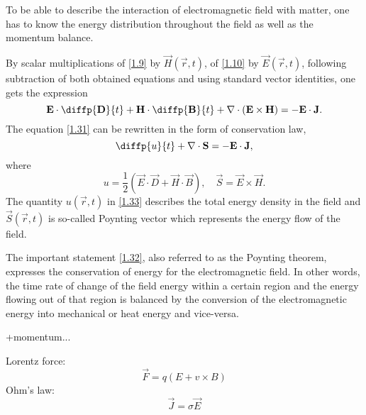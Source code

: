 To be able to describe the interaction of electromagnetic field with matter, one has to know the energy distribution throughout the field as well as the momentum balance.

By scalar multiplications of \ref{1.9} by $ \vec{H}\left( \vec{r}, t \right) $, of \ref{1.10} by $ \vec{E}\left( \vec{r}, t \right) $, following subtraction of both obtained equations and using standard vector identities, one gets the expression 
\begin{equation}
\label{1.31}
\vec{E} \cdot \diffp{\vec{D}}{t} + \vec{H} \cdot \diffp{\vec{B}}{t} + \div{\left(\vec{E} \times \vec{H} \right)} = -\vec{E} \cdot \vec{J}.
\end{equation}
The equation \ref{1.31} can be rewritten in the form of conservation law,
\begin{equation}
\label{1.32}
\diffp{u}{t} + \div{\vec{S}} = - \vec{E} \cdot \vec{J},
\end{equation}
where
\begin{equation}
\label{1.33}
u = \frac{1}{2} \left(\vec{E} \cdot \vec{D} + \vec{H} \cdot \vec{B} \right), \quad \vec{S} = \vec{E} \times \vec{H}.
\end{equation}
The quantity $ u\left( \vec{r}, t \right) $ in \ref{1.33} describes the total energy density in the field and $ \vec{S}\left( \vec{r}, t \right) $ is so-called Poynting vector which represents the energy flow of the field.

The important statement \ref{1.32}, also referred to as the Poynting theorem, expresses the conservation of energy for the electromagnetic field. In other words, the time rate of change of the field energy within a certain region and the energy flowing out of that region is balanced by the conversion of the electromagnetic energy into mechanical or heat energy and vice-versa.

+momentum...

\noindent
Lorentz force:
\begin{equation}
\vec{F} = q \left(E + v \times B \right) 
\end{equation}
Ohm's law:
\begin{equation}
\vec{J} = \sigma \vec{E}
\end{equation}